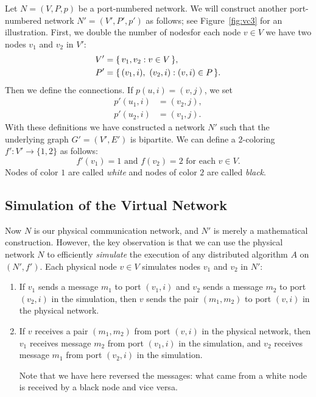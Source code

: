 Let $N = (V,P,p)$ be a port-numbered network. We will construct another port-numbered network $N' = (V'\!,P'\!,p')$ as follows; see Figure~\ref{fig:vc3} for an illustration. First, we double the number of nodes\mydash for each node $v \in V$ we have two nodes $v_1$ and $v_2$ in $V'$:
\begin{align*}
    V' &= \{\,  v_1, v_2 : v \in V  \,\}, \\
    P' &= \{\,  (v_1,i),\ (v_2,i) : (v,i) \in P  \,\}.
\end{align*}
Then we define the connections. If $p(u,i) = (v,j)$, we set
\begin{align*}
    p'(u_1,i) &= (v_2,j), \\
    p'(u_2,i) &= (v_1,j).
\end{align*}
With these definitions we have constructed a network $N'$ such that the underlying graph $G' = (V'\!,E')$ is bipartite. We can define a $2$-coloring $f'\colon V' \to \{1,2\}$ as follows:
\[
    f'(v_1) = 1 \text{ and } f(v_2) = 2 \text{ for each } v \in V.
\]
Nodes of color $1$ are called \emph{white} and nodes of color $2$ are called \emph{black}.


\subsection{Simulation of the Virtual Network}

Now $N$ is our physical communication network, and $N'$ is merely a mathematical construction. However, the key observation is that we can use the physical network $N$ to efficiently \emph{simulate} the execution of any distributed algorithm $A$ on $(N'\!, f')$. Each physical node $v \in V$ simulates nodes $v_1$ and $v_2$ in $N'$:
\begin{enumerate}
    \item If $v_1$ sends a message $m_1$ to port $(v_1,i)$ and $v_2$ sends a message $m_2$ to port $(v_2,i)$ in the simulation, then $v$ sends the pair $(m_1,m_2)$ to port $(v,i)$ in the physical network.
    \item If $v$ receives a pair $(m_1,m_2)$ from port $(v,i)$ in the physical network, then $v_1$ receives message $m_2$ from port $(v_1,i)$ in the simulation, and $v_2$ receives message $m_1$ from port $(v_2,i)$ in the simulation.
    
    Note that we have here reversed the messages: what came from a white node is received by a black node and vice versa.
\end{enumerate}

